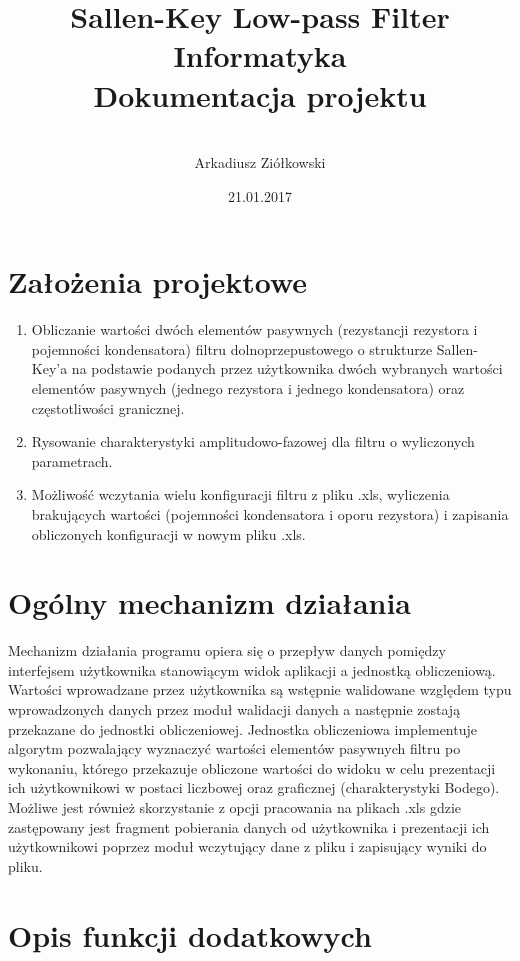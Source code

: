 \documentclass[a4paper,12pt]{article}
\title{\Huge \textbf{Sallen-Key Low-pass Filter\\[0.3in]} 
  \huge Informatyka \\[0.2in]
  \LARGE Dokumentacja projektu
}
\date{21.01.2017}
\author{
 	\quad	\\
  Arkadiusz Ziółkowski\\
}
\begin{document}
\maketitle
\pagebreak

\tableofcontents
\pagebreak


\section{Założenia projektowe}

	\begin{enumerate}
		\item Obliczanie wartości dwóch elementów pasywnych (rezystancji rezystora i 
		pojemności kondensatora) filtru dolnoprzepustowego o strukturze Sallen-Key'a
		na podstawie podanych przez użytkownika dwóch wybranych wartości elementów 
		pasywnych (jednego rezystora i jednego kondensatora) oraz częstotliwości
		granicznej.
		\item Rysowanie charakterystyki amplitudowo-fazowej dla filtru o wyliczonych
		 parametrach.
		\item Możliwość wczytania wielu konfiguracji filtru z pliku .xls, wyliczenia 
		brakujących wartości (pojemności kondensatora i oporu rezystora) i zapisania
		obliczonych konfiguracji w nowym pliku .xls.
	\end{enumerate}

\section{Ogólny mechanizm działania}

	Mechanizm działania programu opiera się o przepływ danych pomiędzy interfejsem
	użytkownika stanowiącym widok aplikacji a jednostką obliczeniową. 
	Wartości wprowadzane przez użytkownika są wstępnie walidowane względem typu
	wprowadzonych danych przez moduł walidacji danych a następnie zostają przekazane
	do jednostki obliczeniowej.
	Jednostka obliczeniowa implementuje algorytm pozwalający
	wyznaczyć wartości elementów pasywnych filtru po wykonaniu, którego przekazuje
	obliczone wartości do widoku w celu prezentacji ich użytkownikowi w postaci liczbowej
	oraz graficznej (charakterystyki Bodego). \\
	Możliwe jest również skorzystanie z opcji pracowania na plikach .xls gdzie zastępowany 
	jest fragment pobierania danych od użytkownika i prezentacji ich użytkownikowi  poprzez
	moduł wczytujący dane z pliku i zapisujący wyniki do pliku.

\section{Opis funkcji dodatkowych}
\end{document}
